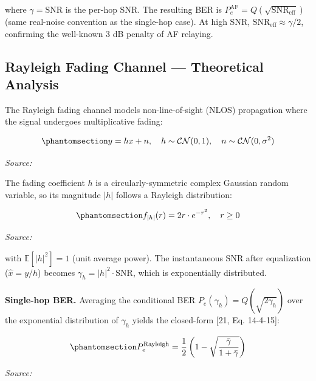 where \(\gamma = \text{SNR}\) is the per-hop SNR. The resulting BER is \(P_e^{\text{AF}} = Q\left(\sqrt{\text{SNR}_{\text{eff}}}\right)\) (same real-noise convention as the single-hop case). At high SNR, \(\text{SNR}_{\text{eff}} \approx \gamma/2\), confirming the well-known 3 dB penalty of AF relaying.


\subsection{Rayleigh Fading Channel --- Theoretical Analysis}\label{sec:rayleigh-fading-channel-theoretical-analysis}

The Rayleigh fading channel models non-line-of-sight (NLOS) propagation where the signal undergoes multiplicative fading:

\begin{equation}\protect\phantomsection\label{eq:rayleigh-channel}{y = hx + n, \quad h \sim \mathcal{CN}(0, 1), \quad n \sim \mathcal{CN}(0, \sigma^2)
}\end{equation} \par{\small\textit{Source: \cite{proakis2008digital}}}

The fading coefficient \(h\) is a circularly-symmetric complex Gaussian random variable, so its magnitude \(|h|\) follows a Rayleigh distribution:

\begin{equation}\protect\phantomsection\label{eq:rayleigh-pdf}{f_{|h|}(r) = 2r \cdot e^{-r^2}, \quad r \geq 0
}\end{equation} \par{\small\textit{Source: \cite{proakis2008digital}}}

with \(\mathbb{E}[|h|^2] = 1\) (unit average power). The instantaneous SNR after equalization (\(\hat{x} = y/h\)) becomes \(\gamma_h = |h|^2 \cdot \text{SNR}\), which is exponentially distributed.

\textbf{Single-hop BER.} Averaging the conditional BER \(P_e(\gamma_h) = Q(\sqrt{2\gamma_h})\) over the exponential distribution of \(\gamma_h\) yields the closed-form {[}21, Eq. 14-4-15{]}:

\begin{equation}\protect\phantomsection\label{eq:rayleigh-ber}{P_e^{\text{Rayleigh}} = \frac{1}{2}\left(1 - \sqrt{\frac{\bar{\gamma}}{1 + \bar{\gamma}}}\right)
}\end{equation} \par{\small\textit{Source: \cite{proakis2008digital}}}

